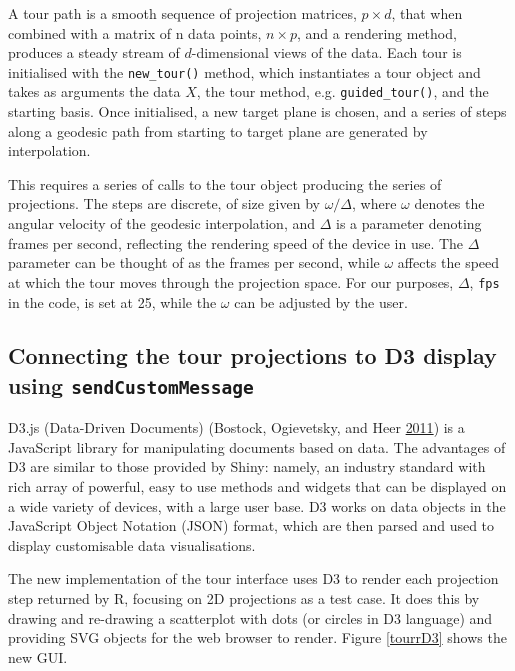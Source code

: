 A tour path is a smooth sequence of projection matrices, \(p\times d\),
that when combined with a matrix of n data points, \(n\times p\), and a
rendering method, produces a steady stream of \(d\)-dimensional views of
the data. Each tour is initialised with the \texttt{new\_tour()} method,
which instantiates a tour object and takes as arguments the data \(X\),
the tour method, e.g. \texttt{guided\_tour()}, and the starting basis.
Once initialised, a new target plane is chosen, and a series of steps
along a geodesic path from starting to target plane are generated by
interpolation.

This requires a series of calls to the tour object producing the series
of projections. The steps are discrete, of size given by
\(\omega/\Delta\), where \(\omega\) denotes the angular velocity of the
geodesic interpolation, and \(\Delta\) is a parameter denoting frames
per second, reflecting the rendering speed of the device in use. The
\(\Delta\) parameter can be thought of as the frames per second, while
\(\omega\) affects the speed at which the tour moves through the
projection space. For our purposes, \(\Delta\), \texttt{fps} in the
code, is set at 25, while the \(\omega\) can be adjusted by the user.

\subsection{\texorpdfstring{Connecting the tour projections to D3
display using
\texttt{sendCustomMessage}}{Connecting the tour projections to D3 display using sendCustomMessage}}\label{connecting-the-tour-projections-to-d3-display-using-sendcustommessage}

D3.js (Data-Driven Documents) (Bostock, Ogievetsky, and Heer
\protect\hyperlink{ref-D3}{2011}) is a JavaScript library for
manipulating documents based on data. The advantages of D3 are similar
to those provided by Shiny: namely, an industry standard with rich array
of powerful, easy to use methods and widgets that can be displayed on a
wide variety of devices, with a large user base. D3 works on data
objects in the JavaScript Object Notation (JSON) format, which are then
parsed and used to display customisable data visualisations.

The new implementation of the tour interface uses D3 to render each
projection step returned by R, focusing on 2D projections as a test
case. It does this by drawing and re-drawing a scatterplot with dots (or
circles in D3 language) and providing SVG objects for the web browser to
render. Figure \ref{tourrD3} shows the new GUI.

